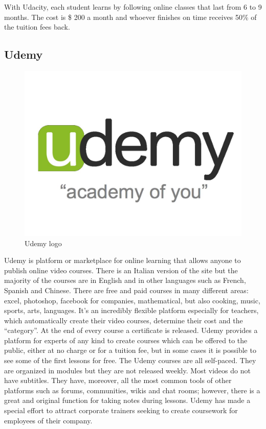 With Udacity, each student learns by following online classes that last from 6 to 9 months. The cost is \$ 200 a month and whoever finishes on time receives 50\% of the tuition fees back.



\subsection{Udemy}
\label{subsec:udemy}
\begin{figure}[htb] %
 \centering
 \includegraphics[width=0.5\linewidth]{images/chapter1/udemy.jpg}\hfill
 \caption[Udemy logo]{Udemy logo}
 \label{fig:fourV}
\end{figure}

Udemy is platform or marketplace for online learning that allows anyone to publish online video  courses. There is an Italian version of the site but the majority of the courses are in English and in other languages such as French, Spanish and Chinese.
There are free and paid courses in many different areas: excel, photoshop, facebook for companies, mathematical, but also cooking, music, sports, arts, languages.
It's an incredibly flexible platform especially for teachers, which automatically create their video courses, determine their cost and the “category”.
At the end of every course a certificate is released. Udemy provides a platform for experts of any kind to create courses which can be offered to the public, either at no charge or for a tuition fee, but in some cases it is possible to see some of the first lessons for free.
The Udemy courses are all self-paced. They are organized in modules but they are not released weekly. Most videos do not have subtitles. They have, moreover, all the most common tools of other platforms such as forums, communities, wikis and chat rooms; however, there is a great and original function for taking notes during lessons.
Udemy has made a special effort to attract corporate trainers seeking to create coursework for employees of their company.\cite{mooc_udemy}